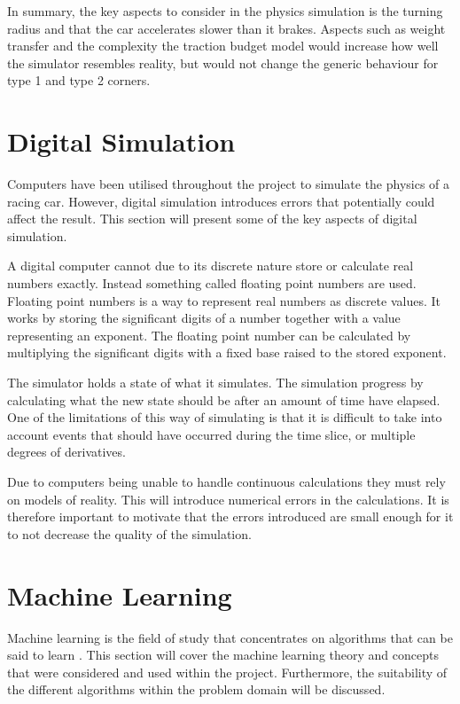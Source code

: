 In summary, the key aspects to consider in the physics simulation is the turning radius and that the car accelerates slower than it brakes. Aspects such as weight transfer and the complexity the traction budget model would increase how well the simulator resembles reality, but would not change the generic behaviour for type 1 and type 2 corners. 

\section{Digital Simulation}


Computers have been utilised throughout the project to simulate the physics of a racing car. However, digital simulation introduces errors that potentially could affect the result. This section will present some of the key aspects of digital simulation. 

A digital computer cannot due to its discrete nature store or calculate real numbers exactly. Instead something called floating point numbers are used. Floating point numbers is a way to represent real numbers as discrete values. It works by storing the significant digits of a number together with a value representing an exponent. The floating point number can be calculated by multiplying the significant digits with a fixed base raised to the stored exponent.

The simulator holds a state of what it simulates. The simulation progress by calculating what the new state should be after an amount of time have elapsed. One of the limitations of this way of simulating is that it is difficult to take into account events that should have occurred during the time slice, or multiple degrees of derivatives. 

Due to computers being unable to handle continuous calculations they must rely on models of reality. This will introduce numerical errors in the calculations. It is therefore important to motivate that the errors introduced are small enough for it to not decrease the quality of the simulation.



\section{Machine Learning}
Machine learning is the field of study that concentrates on algorithms that can be said to learn \cite{glossary}. This section will cover the machine learning theory and concepts that were considered and used within the project. Furthermore, the suitability of the different algorithms within the problem domain will be discussed.  

